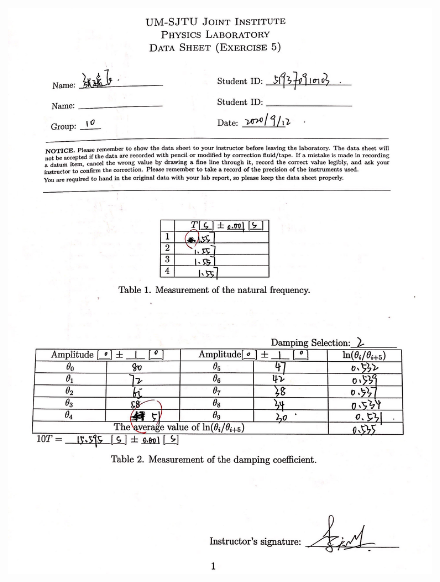 \documentclass[12pt,a4paper]{article}
\begin{document}
\begin{figure}[t]
    \centering
    \includegraphics[scale=0.2]{raw1.jpg}
\end{figure}
\end{document}
